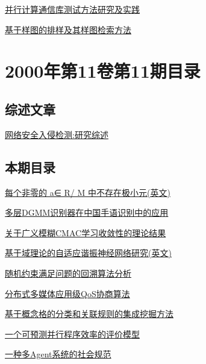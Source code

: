\documentclass[a4paper]{article}
\begin{document}
\href{http://www.jos.org.cn/ch/reader/download_pdf.aspx?file_no=20001218&year_id=2000&quarter_id=12&falg=1}{并行计算通信库测试方法研究及实践}

\href{http://www.jos.org.cn/ch/reader/download_pdf.aspx?file_no=20001219&year_id=2000&quarter_id=12&falg=1}{基于样图的排样及其样图检索方法}


\section{\textbf{2000年第11卷第11期目录}}
\subsection{综述文章}
\href{http://www.jos.org.cn/ch/reader/download_pdf.aspx?file_no=20001105&year_id=2000&quarter_id=11&falg=1}{网络安全入侵检测:研究综述}

\subsection{本期目录}
\href{http://www.jos.org.cn/ch/reader/download_pdf.aspx?file_no=20001101&year_id=2000&quarter_id=11&falg=1}{每个非零的 a∈ R/ M 中不存在极小元(英文)}

\href{http://www.jos.org.cn/ch/reader/download_pdf.aspx?file_no=20001102&year_id=2000&quarter_id=11&falg=1}{多层DGMM识别器在中国手语识别中的应用}

\href{http://www.jos.org.cn/ch/reader/download_pdf.aspx?file_no=20001103&year_id=2000&quarter_id=11&falg=1}{关于广义模糊CMAC学习收敛性的理论结果}

\href{http://www.jos.org.cn/ch/reader/download_pdf.aspx?file_no=20001104&year_id=2000&quarter_id=11&falg=1}{基于域理论的自适应谐振神经网络研究(英文)}

\href{http://www.jos.org.cn/ch/reader/download_pdf.aspx?file_no=20001106&year_id=2000&quarter_id=11&falg=1}{随机约束满足问题的回溯算法分析}

\href{http://www.jos.org.cn/ch/reader/download_pdf.aspx?file_no=20001107&year_id=2000&quarter_id=11&falg=1}{分布式多媒体应用级QoS协商算法}

\href{http://www.jos.org.cn/ch/reader/download_pdf.aspx?file_no=20001108&year_id=2000&quarter_id=11&falg=1}{基于概念格的分类和关联规则的集成挖掘方法}

\href{http://www.jos.org.cn/ch/reader/download_pdf.aspx?file_no=20001109&year_id=2000&quarter_id=11&falg=1}{一个可预测并行程序效率的评价模型}

\href{http://www.jos.org.cn/ch/reader/download_pdf.aspx?file_no=20001110&year_id=2000&quarter_id=11&falg=1}{一种多Agent系统的社会规范}
\end{document}
